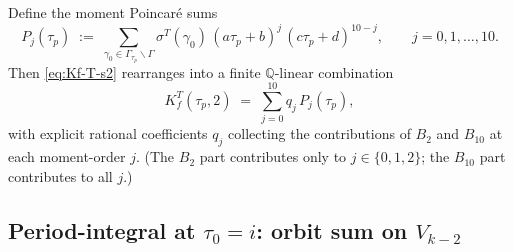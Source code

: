 \documentclass[11pt]{article}
\newcommand{\QQ}{\mathbb{Q}}
\begin{document}
Define the moment Poincar\'e sums
\begin{equation}\label{eq:moment-Pj}
  P_j(\tau_p) \;:=\; \!\sum_{\gamma_0 \in \Gamma_{\tau_p}\backslash\Gamma}\!
  \sigma^T(\gamma_0)\,(a\tau_p + b)^j\,(c\tau_p + d)^{10 - j},
  \qquad j = 0, 1, \ldots, 10.
\end{equation}
Then \eqref{eq:Kf-T-s2} rearranges into a finite $\QQ$-linear
combination
\begin{equation}\label{eq:Kf-T-s2-as-moments}
  K_f^T(\tau_p, 2)
  \;=\; \sum_{j = 0}^{10} q_j\,P_j(\tau_p),
\end{equation}
with explicit rational coefficients $q_j$ collecting the contributions
of $B_2$ and $B_{10}$ at each moment-order $j$.  (The $B_2$ part
contributes only to $j \in \{0, 1, 2\}$; the $B_{10}$ part contributes
to all $j$.)


\subsection{Period-integral at $\tau_0 = i$: orbit sum on $V_{k-2}$}\label{subsec:period-tau0-i}
\end{document}
